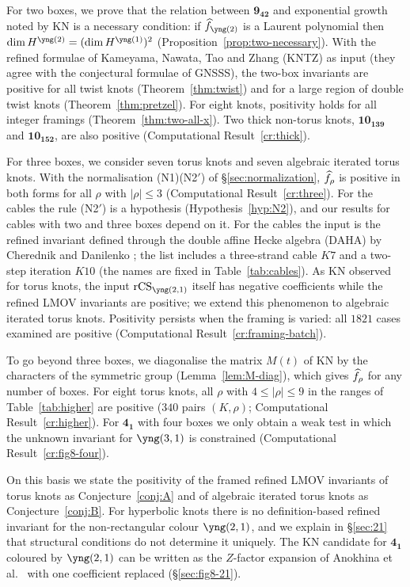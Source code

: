 For two boxes, we prove that the relation between $\mathbf{9_{42}}$ and exponential growth noted by KN is a necessary condition:
if $\hf_{\yng(2)}$ is a Laurent polynomial then $\dim H^{\yng(2)}=(\dim H^{\yng(1)})^2$ (Proposition~\ref{prop:two-necessary}).
With the refined formulae of Kameyama, Nawata, Tao and Zhang (KNTZ) \cite{Kameyama19} as input (they agree with the conjectural formulae of GNSSS),
the two-box invariants are positive for all twist knots (Theorem~\ref{thm:twist}) and for a large region of double twist knots (Theorem~\ref{thm:pretzel}).
For eight knots, positivity holds for all integer framings (Theorem~\ref{thm:two-all-x}).
Two thick non-torus knots, $\mathbf{10_{139}}$ and $\mathbf{10_{152}}$, are also positive (Computational Result~\ref{cr:thick}).

For three boxes, we consider seven torus knots and seven algebraic iterated torus knots. With the normalisation (N1)(N2$'$) of \S\ref{sec:normalization},
$\widehat{f}_\rho$ is positive in both forms for all $\rho$ with $|\rho|\le3$ (Computational Result~\ref{cr:three}).
For the cables the rule (N2$'$) is a hypothesis (Hypothesis~\ref{hyp:N2}), and our results for cables with two and three boxes depend on it.
For the cables the input is the refined invariant defined through the double affine Hecke algebra (DAHA) by Cherednik and Danilenko \cite{Cherednik14};
the list includes a three-strand cable $K7$ and a two-step iteration $K10$ (the names are fixed in Table~\ref{tab:cables}).
As KN observed for torus knots, the input $\rCS_{\yng(2,1)}$ itself has negative coefficients while the refined LMOV invariants are positive; we extend this phenomenon to algebraic iterated torus knots.
Positivity persists when the framing is varied: all $1821$ cases examined are positive (Computational Result~\ref{cr:framing-batch}).

To go beyond three boxes, we diagonalise the matrix $M(t)$ of KN by the characters of the symmetric group (Lemma~\ref{lem:M-diag}), which gives $\widehat{f}_\rho$ for any number of boxes.
For eight torus knots, all $\rho$ with $4\le|\rho|\le9$ in the ranges of Table~\ref{tab:higher} are positive ($340$ pairs $(K,\rho)$; Computational Result~\ref{cr:higher}).
For $\mathbf{4_1}$ with four boxes we only obtain a weak test in which the unknown invariant for $\yng(3,1)$ is constrained (Computational Result~\ref{cr:fig8-four}).

On this basis we state the positivity of the framed refined LMOV invariants of torus knots as Conjecture~\ref{conj:A} and of algebraic iterated torus knots as Conjecture~\ref{conj:B}.
For hyperbolic knots there is no definition-based refined invariant for the non-rectangular colour $\yng(2,1)$, and we explain in \S\ref{sec:21} that structural conditions do not determine it uniquely.
The KN candidate for $\mathbf{4_1}$ coloured by $\yng(2,1)$ can be written as the $Z$-factor expansion of Anokhina et al.\ \cite{Anokhina12} with one coefficient replaced (\S\ref{sec:fig8-21}).

